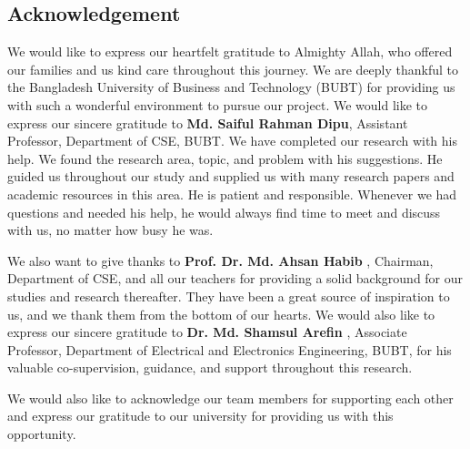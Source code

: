 \begin{center}
    \section*{Acknowledgement}
\end{center}
\large We would like to express our heartfelt gratitude to Almighty Allah, who offered our families and us kind care throughout this journey. We are deeply thankful to the Bangladesh University of Business and Technology (BUBT) for providing us with such a wonderful environment to pursue our project. We would like to express our sincere gratitude to \textbf{Md. Saiful Rahman Dipu}, Assistant Professor, Department of CSE, BUBT. We have completed our research with his help. We found the research area, topic, and problem with his suggestions. He guided us throughout our study and supplied us with many research papers and academic resources in this area. He is patient and responsible. Whenever we had questions and needed his help, he would always find time to meet and discuss with us, no matter how busy he was.

We also want to give thanks to \textbf{ Prof. Dr. Md. Ahsan Habib }, Chairman, Department of CSE, and all our teachers for providing a solid background for our studies and research thereafter. They have been a great source of inspiration to us, and we thank them from the bottom of our hearts. We would also like to express our sincere gratitude to \textbf{ Dr. Md. Shamsul Arefin }, Associate Professor, Department of Electrical and Electronics Engineering, BUBT, for his valuable co-supervision, guidance, and support throughout this research.

We would also like to acknowledge our team members for supporting each other and express our gratitude to our university for providing us with this opportunity.

